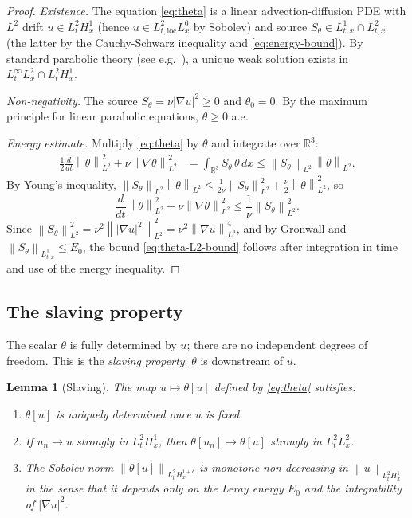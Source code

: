\documentclass[12pt]{article}
\theoremstyle{plain}
\newtheorem{lemma}[theorem]{Lemma}
\theoremstyle{definition}
\theoremstyle{remark}
\newcommand{\R}{\mathbb{R}}
\newcommand{\norm}[1]{\left\|#1\right\|}
\newcommand{\abs}[1]{\left|#1\right|}
\newcommand{\grad}{\nabla}
\begin{document}
\begin{proof}
  \textit{Existence.}
  The equation \eqref{eq:theta} is a linear advection-diffusion PDE with
  $L^2$ drift $u\in L^2_t H^1_x$ (hence $u\in L^2_{t,\text{loc}}L^6_x$
  by Sobolev) and source $S_\theta\in L^1_{t,x}\cap L^2_{t,x}$ (the latter
  by the Cauchy-Schwarz inequality and \eqref{eq:energy-bound}).
  By standard parabolic theory (see e.g.\ \cite{LadyzhenskayaBook1968}), a unique
  weak solution exists in $L^\infty_t L^2_x\cap L^2_t H^1_x$.

  \textit{Non-negativity.}
  The source $S_\theta=\nu\abs{\grad u}^2\geq 0$ and $\theta_0=0$.
  By the maximum principle for linear parabolic equations,
  $\theta\geq 0$ a.e.

  \textit{Energy estimate.}
  Multiply \eqref{eq:theta} by $\theta$ and integrate over $\R^3$:
  \begin{align*}
    \frac{1}{2}\frac{d}{dt}\norm{\theta}_{L^2}^2
    + \nu\norm{\grad\theta}_{L^2}^2
    &= \int_{\R^3}S_\theta\,\theta\,dx
    \leq \norm{S_\theta}_{L^2}\,\norm{\theta}_{L^2}.
  \end{align*}
  By Young's inequality, $\norm{S_\theta}_{L^2}\norm{\theta}_{L^2}
  \leq \frac{1}{2\nu}\norm{S_\theta}_{L^2}^2
       +\frac{\nu}{2}\norm{\theta}_{L^2}^2$,
  so
  \[
    \frac{d}{dt}\norm{\theta}_{L^2}^2 + \nu\norm{\grad\theta}_{L^2}^2
    \leq \frac{1}{\nu}\norm{S_\theta}_{L^2}^2.
  \]
  Since $\norm{S_\theta}_{L^2}^2 = \nu^2\norm{\abs{\grad u}^2}_{L^2}^2
  = \nu^2\norm{\grad u}_{L^4}^4$, and by Gronwall and
  $\norm{S_\theta}_{L^1_{t,x}}\leq E_0$, the bound
  \eqref{eq:theta-L2-bound} follows after integration in time and
  use of the energy inequality.
\end{proof}

\subsection{The slaving property}

The scalar $\theta$ is fully determined by $u$; there are no independent
degrees of freedom.
This is the \emph{slaving property}: $\theta$ is downstream of $u$.

\begin{lemma}[Slaving]\label{lem:slaving}
  The map $u\mapsto\theta[u]$ defined by \eqref{eq:theta} satisfies:
  \begin{enumerate}[label=(\roman*)]
    \item $\theta[u]$ is uniquely determined once $u$ is fixed.
    \item If $u_n\to u$ strongly in $L^2_t H^1_x$, then
          $\theta[u_n]\to\theta[u]$ strongly in $L^2_t L^2_x$.
    \item The Sobolev norm $\norm{\theta[u]}_{L^2_t H^{1+\delta}_x}$ is
          monotone non-decreasing in $\norm{u}_{L^2_t H^1_x}$
          in the sense that it depends only on the Leray energy $E_0$
          and the integrability of $\abs{\grad u}^2$.
  \end{enumerate}
\end{lemma}
\end{document}

